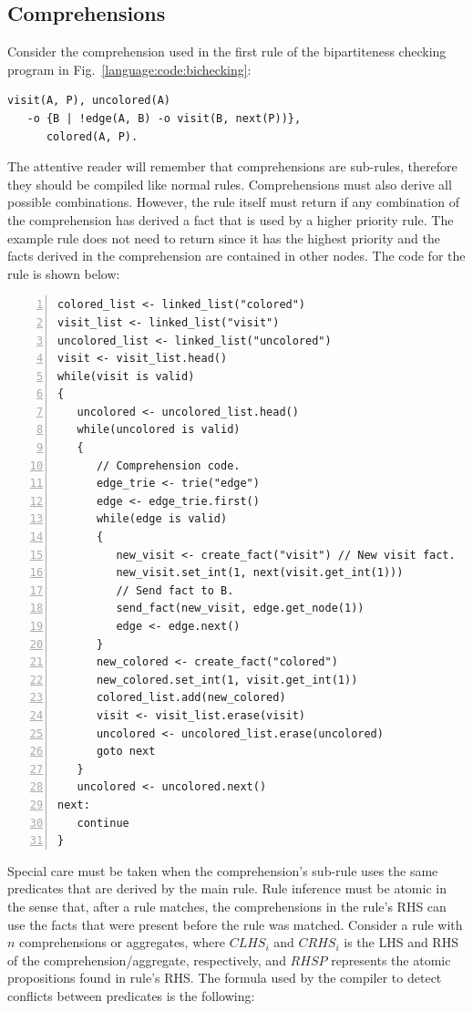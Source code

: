 \subsection{Comprehensions}

Consider the comprehension used in the first rule of the bipartiteness checking
program in Fig.~\ref{language:code:bichecking}:

\begin{Verbatim}[fontsize=\codesize]
visit(A, P), uncolored(A)
   -o {B | !edge(A, B) -o visit(B, next(P))},
      colored(A, P).
\end{Verbatim}

The attentive reader will remember that comprehensions are sub-rules, therefore
they should be compiled like normal rules. Comprehensions must also derive all
possible combinations. However, the rule itself must return if any combination
of the comprehension has derived a fact that is used by a higher priority rule.
The example rule does not need to return since it has the highest priority and
the  facts derived in the comprehension are contained in other
nodes. The code for the rule is shown below:

\begin{Verbatim}[numbers=left,fontsize=\codesize]
colored_list <- linked_list("colored")
visit_list <- linked_list("visit")
uncolored_list <- linked_list("uncolored")
visit <- visit_list.head()
while(visit is valid)
{
   uncolored <- uncolored_list.head()
   while(uncolored is valid)
   {
      // Comprehension code.
      edge_trie <- trie("edge")
      edge <- edge_trie.first()
      while(edge is valid)
      {
         new_visit <- create_fact("visit") // New visit fact.
         new_visit.set_int(1, next(visit.get_int(1)))
         // Send fact to B.
         send_fact(new_visit, edge.get_node(1))
         edge <- edge.next()
      }
      new_colored <- create_fact("colored")
      new_colored.set_int(1, visit.get_int(1))
      colored_list.add(new_colored)
      visit <- visit_list.erase(visit)
      uncolored <- uncolored_list.erase(uncolored)
      goto next
   }
   uncolored <- uncolored.next()
next:
   continue
}
\end{Verbatim}

Special care must be taken when the comprehension's sub-rule uses the same
predicates that are derived by the main rule. Rule inference must be atomic in
the sense that, after a rule matches, the comprehensions in the rule's RHS can
use the facts that were present before the rule was matched. Consider a rule
with $n$ comprehensions or aggregates, where $CLHS_i$ and $CRHS_i$ is the LHS
and RHS of the comprehension/aggregate, respectively, and $RHSP$ represents the
atomic propositions found in rule's RHS. The formula used by the compiler to
detect conflicts between predicates is the following:

